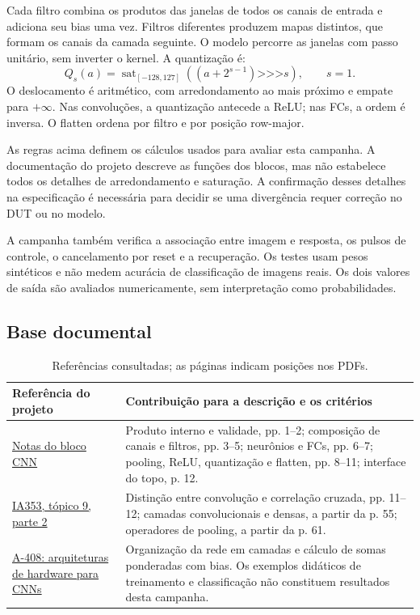 \documentclass[12pt,a4paper]{article}
\begin{document}
Cada filtro combina os produtos das janelas de todos os canais de entrada e adiciona seu bias uma vez. Filtros diferentes produzem mapas distintos, que formam os canais da camada seguinte. O modelo percorre as janelas com passo unitário, sem inverter o kernel. A quantização é:
\[
Q_s(a)=\operatorname{sat}_{[-128,127]}
\left((a+2^{s-1})\mathbin{\texttt{>>>}}s\right),\qquad s=1.
\]
O deslocamento é aritmético, com arredondamento ao mais próximo e empate para $+\infty$. Nas convoluções, a quantização antecede a ReLU; nas FCs, a ordem é inversa. O flatten ordena por filtro e por posição row-major.

As regras acima definem os cálculos usados para avaliar esta campanha. A documentação do projeto descreve as funções dos blocos, mas não estabelece todos os detalhes de arredondamento e saturação. A confirmação desses detalhes na especificação é necessária para decidir se uma divergência requer correção no DUT ou no modelo.

A campanha também verifica a associação entre imagem e resposta, os pulsos de controle, o cancelamento por reset e a recuperação. Os testes usam pesos sintéticos e não medem acurácia de classificação de imagens reais. Os dois valores de saída são avaliados numericamente, sem interpretação como probabilidades.

\subsection{Base documental}
\begin{table}[H]\centering\small
\begin{tabularx}{\textwidth}{>{\raggedright\arraybackslash}p{7.2cm}>{\raggedright\arraybackslash}X}\toprule
\textbf{Referência do projeto} & \textbf{Contribuição para a descrição e os critérios}\\\midrule
\href{../../../docs/CNN_block_notes.pdf}{Notas do bloco CNN} & Produto interno e validade, pp. 1--2; composição de canais e filtros, pp. 3--5; neurônios e FCs, pp. 6--7; pooling, ReLU, quantização e flatten, pp. 8--11; interface do topo, p. 12.\\
\href{../../../docs/topico9_P2_IA353_1s2026.pdf}{IA353, tópico 9, parte 2} & Distinção entre convolução e correlação cruzada, pp. 11--12; camadas convolucionais e densas, a partir da p. 55; operadores de pooling, a partir da p. 61.\\
\href{../../../docs/material_de_aula_cd_hbr_de_arquiteturas_para_redes_neurais.pdf}{A-408: arquiteturas de hardware para CNNs} & Organização da rede em camadas e cálculo de somas ponderadas com bias. Os exemplos didáticos de treinamento e classificação não constituem resultados desta campanha.\\\bottomrule
\end{tabularx}
\caption{Referências consultadas; as páginas indicam posições nos PDFs.}
\end{table}
\end{document}
